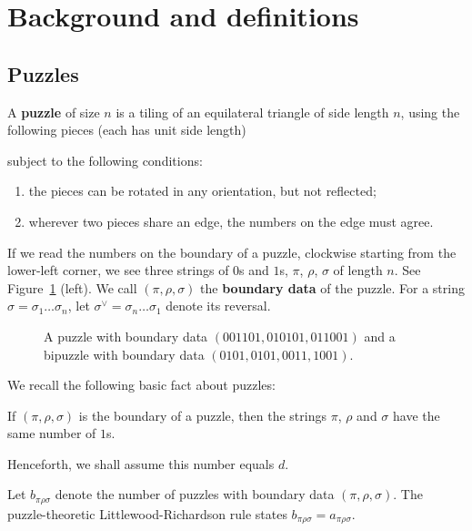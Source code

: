 \section{Background and definitions}
\label{sec:background}
\subsection{Puzzles}
\label{sec:puzzles}
A {\bf puzzle} of size $n$ is a tiling of an equilateral triangle of 
side length $n$, using the following pieces (each has unit side length)
\begin{center}
\end{center}
subject to the following conditions:
\begin{enumerate}
\item[(i)]
the pieces can be rotated in any orientation, but not reflected;
\item[(ii)]
wherever two pieces share an edge, the numbers on the edge must
agree.
\end{enumerate}

If we read the numbers on the boundary of a puzzle, clockwise starting
from the lower-left corner, we see three strings of $0$s and $1$s,
$\pi$, $\rho$, $\sigma$ of length $n$. See Figure~\ref{fig:puzzle} (left). 
We call $(\pi, \rho, \sigma)$ the {\bf boundary data} of the puzzle.  
For a string $\sigma=\sigma_1\ldots\sigma_n$, let
$\sigma^\vee = \sigma_n \ldots \sigma_1$ denote its reversal.

\begin{figure}[htbp]
  \begin{center}
    \caption{A puzzle with boundary data $(001101, 010101, 011001)$
and a bipuzzle with boundary data $(0101, 0101, 0011, 1001)$.}
    \label{fig:puzzle}
  \end{center}
\end{figure}

We recall the following basic fact about puzzles:
\begin{proposition}
If $(\pi, \rho, \sigma)$ is the boundary of a puzzle, then the
strings $\pi$, $\rho$ and $\sigma$ have the same number of $1$s.
\end{proposition}
Henceforth, we shall assume this number equals $d$.

Let $b_{\pi \rho \sigma}$ denote the number of puzzles with
boundary data $(\pi, \rho, \sigma)$.  The puzzle-theoretic
Littlewood-Richardson rule states
$b_{\pi \rho \sigma} = a_{\pi \rho \sigma}$.

